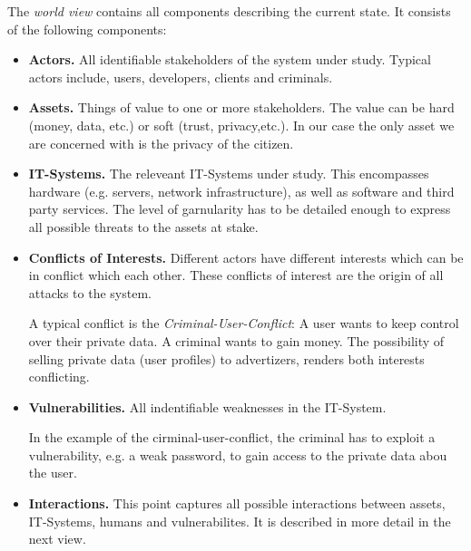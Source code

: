 The \emph{world view} contains all components describing the current state.
It consists of the following components:
\begin{itemize}
\item \textbf{Actors.}
All identifiable stakeholders of the system under study.
Typical actors include, users, developers, clients and criminals.

\item
\textbf{Assets.} Things of value to one or more stakeholders.
The value can be hard (money, data, etc.) or soft (trust, privacy,etc.).
In our case the only asset we are concerned with is the privacy of the citizen.

\item \textbf{IT-Systems.}
The releveant IT-Systems under study. This encompasses hardware (e.g. servers, network infrastructure), as well as software and third party services.
The level of garnularity has to be detailed enough to express all possible threats to the assets at stake.

\item \textbf{Conflicts of Interests.}
Different actors have different interests which can be in conflict which each other.
These conflicts of interest are the origin of all attacks to the system.

A typical conflict is the \emph{Criminal-User-Conflict}:
A user wants to keep control over their private data.
A criminal wants to gain money.
The possibility of selling private data (user profiles) to advertizers, renders both interests conflicting.

\item \textbf{Vulnerabilities.}
All indentifiable weaknesses in the IT-System.

In the example of the cirminal-user-conflict, the criminal has to exploit a vulnerability, e.g. a weak password, to gain access to the private data abou the user.

\item \textbf{Interactions.}
This point captures all possible interactions between assets, IT-Systems, humans and vulnerabilites.
It is described in more detail in the next view.
\end{itemize}




